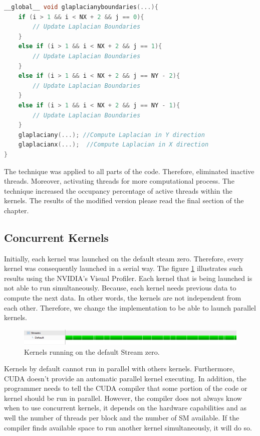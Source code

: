 \begin{lstlisting}[language=C++, label={lst:newcde}, caption={More workload on a single kernel execution}]
__global__ void glaplacianyboundaries(...){
    if (i > 1 && i < NX + 2 && j == 0){
     	// Update Laplacian Boundaries
    }
    else if (i > 1 && i < NX + 2 && j == 1){
  		// Update Laplacian Boundaries
    }
    else if (i > 1 && i < NX + 2 && j == NY - 2){
        // Update Laplacian Boundaries
    }
    else if (i > 1 && i < NX + 2 && j == NY - 1){
        // Update Laplacian Boundaries
    }
    glaplaciany(...); //Compute Laplacian in Y direction
	glaplacianx(...);  //Compute Laplacian in X direction
}
\end{lstlisting}

The technique was applied to all parts of the code. Therefore, eliminated inactive threads. Moreover, activating threads for more computational process. The technique increased the occupancy percentage of active threads within the kernels. The results of the modified version please read the final section of the chapter.

\subsection{Concurrent Kernels}

Initially, each kernel was launched on the default steam zero. Therefore, every kernel was consequently launched in a serial way. The figure \ref{fig:streams} illustrates such results using the NVIDIA's Visual Profiler. Each kernel that is being launched is not able to run simultaneously. Because, each kernel needs previous data to compute the next data. In other words, the kernels are not independent from each other. Therefore, we change the implementation to be able to launch parallel kernels.

\begin{figure}[htbp]
	\centering
		\includegraphics[width=1.0\textwidth]{Figures/ini_steams.png}
		\smallskip
	\caption[Initial Streams]{Kernels running on the default Stream zero.
}
	\label{fig:streams}
\end{figure}

 Kernels by default cannot run in parallel with others kernels. Furthermore, CUDA doesn't provide an automatic parallel kernel executing. In addition, the programmer needs to tell the CUDA compiler that some portion of the code or kernel should be run in parallel. However, the compiler does not always know when to use concurrent kernels, it depends on the hardware capabilities and as well the number of threads per block and the number of SM available. If the compiler finds available space to run another kernel simultaneously, it will do so. 

